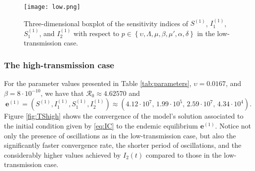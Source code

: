 \documentclass[11pt,reqno]{amsart}
\newcommand{\cR}{\mathcal{R}}
\begin{document}
\begin{figure}\centering
	\texttt{[image: low.png]}
	\caption{\label{fig:sensitivitylow}Three-dimensional boxplot of the sensitivity indices of $S^{(1)}$, $I_1^{(1)}$, $S_1^{(1)}$, and $I_2^{(1)}$ with respect to $p\in\left\{\upsilon,\Lambda,\mu,\beta,\mu',\alpha,\delta\right\}$ in the low-transmission case.}
\end{figure}

\subsubsection*{The high-transmission case}

For the parameter values presented in Table \ref{tab:parameters}, $\upsilon=0.0167$, and $\beta=8\cdot 10^{-10}$, we have that $\cR_0\approx 4.62570$ and
$$\mathbf{e}^{(1)}=\left(S^{(1)},I_1^{(1)},S_1^{(1)}, I_2^{(1)}\right)\approx\left(4.12\cdot 10^7,\, 1.99\cdot 10^5,\, 2.59\cdot 10^7,\, 4.34\cdot 10^{4}\right).$$
Figure \ref{fig:TShigh} shows the convergence of the model's solution associated to the initial condition given by \eqref{eq:IC} to the endemic equilibrium $\mathbf{e}^{(1)}$. Notice not only the presence of oscillations as in the low-transmission case, but also the significantly faster convergence rate, the shorter period of oscillations, and the considerably higher values achieved by $I_2(t)$ compared to those in the low-transmission case.
\end{document}
